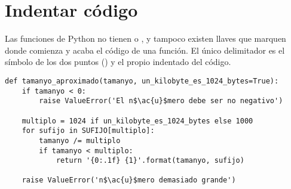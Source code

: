 \section{Indentar código}

Las funciones de Python no tienen  o , y tampoco existen llaves que marquen donde comienza y acaba el código de una función. El único delimitador es el símbolo de los dos puntos (\codigo{:}) y el propio indentado del código.

\noindent\begin{minipage}{\textwidth}
\begin{lstlisting}[mathescape=True]
def tamanyo_aproximado(tamanyo, un_kilobyte_es_1024_bytes=True):
    if tamanyo < 0:
        raise ValueError('El n$\ac{u}$mero debe ser no negativo')
    
    multiplo = 1024 if un_kilobyte_es_1024_bytes else 1000
    for sufijo in SUFIJO[multiplo]:
        tamanyo /= multiplo
        if tamanyo < multiplo:
            return '{0:.1f} {1}'.format(tamanyo, sufijo)

    raise ValueError('n$\ac{u}$mero demasiado grande')
\end{lstlisting}
\end{minipage}

